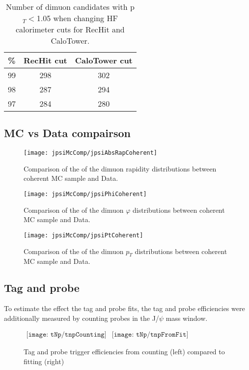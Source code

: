       \begin{table}[!Hhbt]
        \begin{center}
          \caption{Number of dimuon candidates with  p$_{T} <$1.05 when changing HF calorimeter cuts for RecHit and CaloTower.}
          \label{tab:hfAdjThreshYields}
          \begin{tabular}{|c|c|c|} \hline
            \% &  RecHit cut & CaloTower cut\\ \hline
            99 &   298 & 302 \\ \hline
            98 &  287  & 294 \\ \hline
            97 & 284 & 280 \\ \hline
          \end{tabular}
        \end{center}
      \end{table}

    \subsection{MC vs Data compairson}
      \begin{figure}[h]
        \centering
        \texttt{[image: jpsiMcComp/jpsiAbsRapCoherent]}
        \caption{Comparison of the of the dimuon rapidity distributions between 
          coherent MC sample and Data.}
        \label{fig:jpsiAbsRapCoherent}
      \end{figure}
      \begin{figure}[h]
        \centering
        \texttt{[image: jpsiMcComp/jpsiPhiCoherent]}
        \caption{Comparison of the of the dimuon $\varphi$ distributions 
          between coherent MC sample and Data.}
        \label{fig:jpsiPhiCoherent}
      \end{figure}
      \begin{figure}[h]
        \centering
        \texttt{[image: jpsiMcComp/jpsiPtCoherent]}
        \caption{Comparison of the of the dimuon $p_{T}$ distributions 
          between coherent MC sample and Data.}
        \label{fig:jpsiPtCoherent}
      \end{figure}

    \subsection{Tag and probe}
      To estimate the effect the tag and probe fits, the tag and probe 
        efficiencies were additionally measured by counting probes in the 
        J/$\psi$ mass window. 
      \begin{figure}[!Hhbt]
        \centering
        $ \begin{array}{cc}
          \texttt{[image: tNp/tnpCounting]} &
          \texttt{[image: tNp/tnpFromFit]}
        \end{array} $ 
        \caption{Tag and probe trigger efficiencies from counting (left) 
          compared to fitting (right)}
        \label{fig:tnpCntVFit}
      \end{figure}
